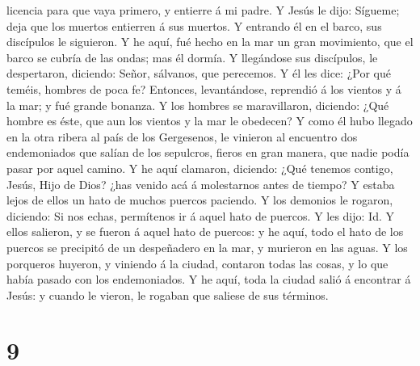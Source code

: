 licencia para que vaya primero, y entierre á mi padre.  Y
Jesús le dijo: Sígueme; deja que los muertos entierren á sus muertos.
 Y entrando él en el barco, sus discípulos le siguieron.
 Y he aquí, fué hecho en la mar un gran movimiento, que el
barco se cubría de las ondas; mas él dormía.  Y llegándose
sus discípulos, le despertaron, diciendo: Señor, sálvanos, que
perecemos.  Y él les dice: ¿Por qué teméis, hombres de poca
fe? Entonces, levantándose, reprendió á los vientos y á la mar; y fué
grande bonanza.  Y los hombres se maravillaron, diciendo:
¿Qué hombre es éste, que aun los vientos y la mar le obedecen?
 Y como él hubo llegado en la otra ribera al país de los
Gergesenos, le vinieron al encuentro dos endemoniados que salían de los
sepulcros, fieros en gran manera, que nadie podía pasar por aquel
camino.  Y he aquí clamaron, diciendo: ¿Qué tenemos
contigo, Jesús, Hijo de Dios? ¿has venido acá á molestarnos antes de
tiempo?  Y estaba lejos de ellos un hato de muchos puercos
paciendo.  Y los demonios le rogaron, diciendo: Si nos
echas, permítenos ir á aquel hato de puercos.  Y les dijo:
Id. Y ellos salieron, y se fueron á aquel hato de puercos: y he aquí,
todo el hato de los puercos se precipitó de un despeñadero en la mar, y
murieron en las aguas.  Y los porqueros huyeron, y viniendo
á la ciudad, contaron todas las cosas, y lo que había pasado con los
endemoniados.  Y he aquí, toda la ciudad salió á encontrar
á Jesús: y cuando le vieron, le rogaban que saliese de sus términos.

\hypertarget{section-8}{%
\section{9}\label{section-8}}

